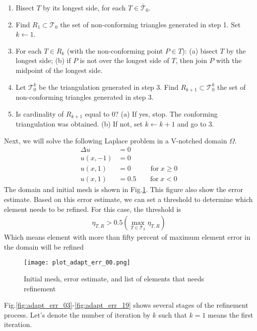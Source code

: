 \documentclass[11pt, letterpaper, hidelinks]{article}
\theoremstyle{definition}
\begin{document}
\begin{enumerate}
    \item Bisect $T$ by its longest side, for each $T \in \bar{\mathcal{T}}_0$.
    \item Find $R_1 \subset \mathcal{T}_0$ the set of non-conforming triangles generated in step 1. Set $k \leftarrow 1$.
    \item For each $T \in R_k$ (with the non-conforming point $P\in T$): (a) bisect $T$ by the longest side; (b) if $P$ is not over the longest side of $T$, then join $P$ with the midpoint of the longest side.
    \item Let $\mathcal{T}_0^k$ be the triangulation generated in step 3. Find $R_{k+1} \subset \mathcal{T}_0^k$ the set of non-conforming triangles generated in step 3.
    \item Is cardinality of $R_{k+1}$ equal to $0$? (a) If yes, stop. The conforming triangulation was obtained. (b) If not, set $k\leftarrow k+1$ and go to 3.
\end{enumerate}

Next, we will solve the following Laplace problem in a V-notched domain $\Omega$.
\begin{align*}
    \Delta u & = 0                                    \\
    u(x,-1)  & = 0                                    \\
    u(x,1)   & = 0 \;\;\; \qquad \text{for} \; x\ge 0 \\
    u(x,1)   & = 0.5 \qquad \text{for} \; x<0
\end{align*}
The domain and initial mesh is shown in Fig.\ref{fig:adapt_err_00}. This figure also show the error estimate. Based on this error estimate, we can set a threshold to determine which element needs to be refined. For this case, the threshold is
\begin{align*}
    \eta_{T,R} > 0.5 \left( \max_{T\in \mathcal{T}_h} \eta_{T,R} \right)
\end{align*}
Which means element with more than fifty percent of maximum element error in the domain will be refined
\begin{figure}[H]
    \texttt{[image: plot\_adapt\_err\_00.png]}
    \centering
    \caption{Initial mesh, error estimate, and list of elements that needs refinement}
    \label{fig:adapt_err_00}
\end{figure}
Fig.\ref{fig:adapt_err_03}-\ref{fig:adapt_err_19} shows several stages of the refinement process. Let's denote the number of iteration by $k$ such that $k=1$ means the first iteration.
\end{document}
